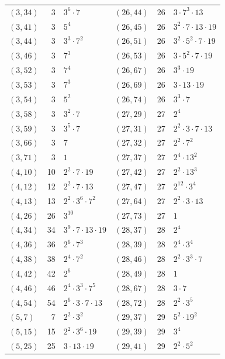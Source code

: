 \documentclass[11pt]{article}
\begin{document}
\begin{longtable}{@{}lrl@{\qquad}lrl@{}}
$(3,34)$ & 3 & $3^{6}\cdot 7$ & $(26,44)$ & 26 & $3\cdot 7^{3}\cdot 13$\\
$(3,41)$ & 3 & $5^{4}$ & $(26,45)$ & 26 & $3^{2}\cdot 7\cdot 13\cdot 19$\\
$(3,44)$ & 3 & $3^{3}\cdot 7^{2}$ & $(26,51)$ & 26 & $3^{2}\cdot 5^{2}\cdot 7\cdot 19$\\
$(3,46)$ & 3 & $7^{3}$ & $(26,53)$ & 26 & $3\cdot 5^{2}\cdot 7\cdot 19$\\
$(3,52)$ & 3 & $7^{4}$ & $(26,67)$ & 26 & $3^{3}\cdot 19$\\
$(3,53)$ & 3 & $7^{3}$ & $(26,69)$ & 26 & $3\cdot 13\cdot 19$\\
$(3,54)$ & 3 & $5^{2}$ & $(26,74)$ & 26 & $3^{3}\cdot 7$\\
$(3,58)$ & 3 & $3^{2}\cdot 7$ & $(27,29)$ & 27 & $2^{4}$\\
$(3,59)$ & 3 & $3^{5}\cdot 7$ & $(27,31)$ & 27 & $2^{2}\cdot 3\cdot 7\cdot 13$\\
$(3,66)$ & 3 & $7$ & $(27,32)$ & 27 & $2^{2}\cdot 7^{2}$\\
$(3,71)$ & 3 & $1$ & $(27,37)$ & 27 & $2^{4}\cdot 13^{2}$\\
$(4,10)$ & 10 & $2^{2}\cdot 7\cdot 19$ & $(27,42)$ & 27 & $2^{2}\cdot 13^{3}$\\
$(4,12)$ & 12 & $2^{2}\cdot 7\cdot 13$ & $(27,47)$ & 27 & $2^{12}\cdot 3^{4}$\\
$(4,13)$ & 13 & $2^{2}\cdot 3^{6}\cdot 7^{2}$ & $(27,64)$ & 27 & $2^{2}\cdot 3\cdot 13$\\
$(4,26)$ & 26 & $3^{10}$ & $(27,73)$ & 27 & $1$\\
$(4,34)$ & 34 & $3^{9}\cdot 7\cdot 13\cdot 19$ & $(28,37)$ & 28 & $2^{4}$\\
$(4,36)$ & 36 & $2^{6}\cdot 7^{3}$ & $(28,39)$ & 28 & $2^{4}\cdot 3^{4}$\\
$(4,38)$ & 38 & $2^{4}\cdot 7^{2}$ & $(28,46)$ & 28 & $2^{2}\cdot 3^{3}\cdot 7$\\
$(4,42)$ & 42 & $2^{6}$ & $(28,49)$ & 28 & $1$\\
$(4,46)$ & 46 & $2^{4}\cdot 3^{3}\cdot 7^{5}$ & $(28,67)$ & 28 & $3\cdot 7$\\
$(4,54)$ & 54 & $2^{6}\cdot 3\cdot 7\cdot 13$ & $(28,72)$ & 28 & $2^{2}\cdot 3^{5}$\\
$(5,7)$ & 7 & $2^{2}\cdot 3^{2}$ & $(29,37)$ & 29 & $5^{2}\cdot 19^{2}$\\
$(5,15)$ & 15 & $2^{2}\cdot 3^{6}\cdot 19$ & $(29,39)$ & 29 & $3^{4}$\\
$(5,25)$ & 25 & $3\cdot 13\cdot 19$ & $(29,41)$ & 29 & $2^{2}\cdot 5^{2}$\\

\end{longtable}
\end{document}
